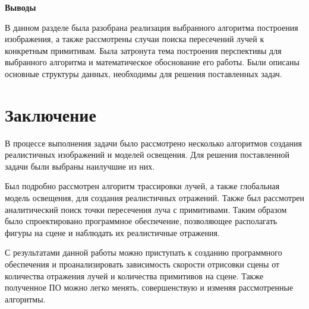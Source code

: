 \textbf{Выводы}

В данном разделе была разобрана реализация выбранного алгоритма построения изображения, а также рассмотрены случаи поиска пересечений лучей  к конкретным примитивам. 
Была затронута тема построения перспективы для выбранного алгоритма и математическое обоснование его работы. Были описаны основные структуры данных, необходимы для решения поставленных задач.

\newpage
\chapter{Заключение}
В процессе выполнения задачи было рассмотрено несколько алгоритмов создания реалистичных изображений и моделей освещения. Для решения поставленной
задачи были выбраны наилучшие из них.

Был подробно рассмотрен алгоритм трассировки лучей, а также глобальная модель освещения, для создания реалистичных отражений. Также был рассмотрен
аналитический поиск точки пересечения луча с примитивами. Таким образом было спроектировано программное  обеспечение, позволяющее располагать фигуры на сцене и
наблюдать их  реалистичные отражения.

С результатами данной работы можно приступать к созданию программного обеспечения и проанализировать зависимость скорости отрисовки сцены от 
количества отражения лучей и количества примитивов на сцене. Также полученное ПО можно легко менять, совершенствую и изменяя рассмотренные алгоритмы.


